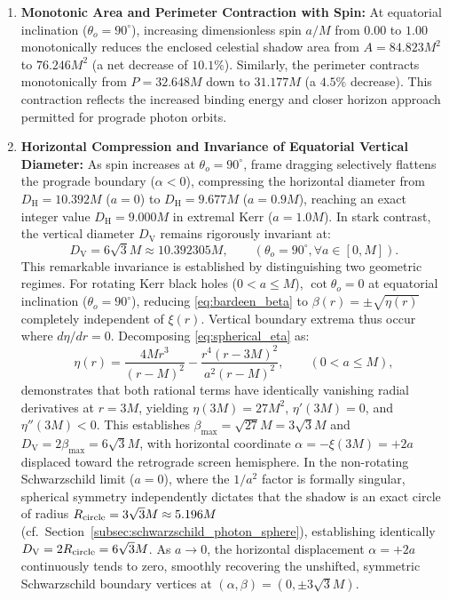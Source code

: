 \begin{enumerate}
    \item \textbf{Monotonic Area and Perimeter Contraction with Spin:}  
    At equatorial inclination ($\theta_o = 90^\circ$), increasing dimensionless spin $a/M$ from $0.00$ to $1.00$ monotonically reduces the enclosed celestial shadow area from $A = 84.823M^2$ to $76.246M^2$ (a net decrease of $10.1\%$). Similarly, the perimeter contracts monotonically from $P = 32.648M$ down to $31.177M$ (a $4.5\%$ decrease). This contraction reflects the increased binding energy and closer horizon approach permitted for prograde photon orbits.
    
    \item \textbf{Horizontal Compression and Invariance of Equatorial Vertical Diameter:}  
    As spin increases at $\theta_o = 90^\circ$, frame dragging selectively flattens the prograde boundary ($\alpha < 0$), compressing the horizontal diameter from $D_{\mathrm{H}} = 10.392M$ ($a=0$) to $D_{\mathrm{H}} = 9.677M$ ($a=0.9M$), reaching an exact integer value $D_{\mathrm{H}} = 9.000M$ in extremal Kerr ($a=1.0M$).  
    In stark contrast, the vertical diameter $D_{\mathrm{V}}$ remains rigorously invariant at:
    \begin{equation}
        D_{\mathrm{V}} = 6\sqrt{3}M \approx 10.392305M, \qquad (\theta_o = 90^\circ, \forall a \in [0, M]).
        \label{eq:dv_invariant}
    \end{equation}
    This remarkable invariance is established by distinguishing two geometric regimes. For rotating Kerr black holes ($0 < a \le M$), $\cot\theta_o = 0$ at equatorial inclination ($\theta_o = 90^\circ$), reducing \eqref{eq:bardeen_beta} to $\beta(r) = \pm\sqrt{\eta(r)}$ completely independent of $\xi(r)$. Vertical boundary extrema thus occur where $d\eta/dr = 0$. Decomposing \eqref{eq:spherical_eta} as:
    \begin{equation}
        \eta(r) = \frac{4Mr^3}{(r-M)^2} - \frac{r^4(r-3M)^2}{a^2(r-M)^2}, \qquad (0 < a \le M),
        \label{eq:eta_decomposition_kerr}
    \end{equation}
    demonstrates that both rational terms have identically vanishing radial derivatives at $r = 3M$, yielding $\eta(3M) = 27M^2$, $\eta'(3M) = 0$, and $\eta''(3M) < 0$. This establishes $\beta_{\max} = \sqrt{27}M = 3\sqrt{3}M$ and $D_{\mathrm{V}} = 2\beta_{\max} = 6\sqrt{3}M$, with horizontal coordinate $\alpha = -\xi(3M) = +2a$ displaced toward the retrograde screen hemisphere. In the non-rotating Schwarzschild limit ($a = 0$), where the $1/a^2$ factor is formally singular, spherical symmetry independently dictates that the shadow is an exact circle of radius $R_{\rm circle} = 3\sqrt{3}M \approx 5.196M$ (cf.~Section~\ref{subsec:schwarzschild_photon_sphere}), establishing identically $D_{\mathrm{V}} = 2 R_{\rm circle} = 6\sqrt{3}M$. As $a \to 0$, the horizontal displacement $\alpha = +2a$ continuously tends to zero, smoothly recovering the unshifted, symmetric Schwarzschild boundary vertices at $(\alpha, \beta) = (0, \pm 3\sqrt{3}M)$.


\end{enumerate}
